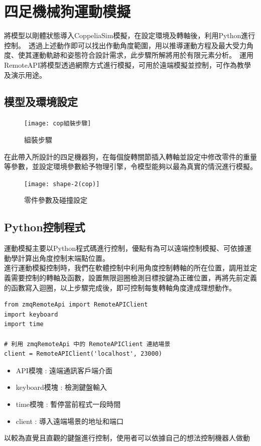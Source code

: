\chapter{四足機械狗運動模擬}
將模型以剛體狀態導入CoppeliaSim模擬，在設定環境及轉軸後，利用Python進行控制。\
透過上述動作即可以找出作動角度範圍，用以推導運動方程及最大受力角度、使其運動軌跡和姿態符合設計需求，此步驟所解將用於有限元素分析。\
運用RemoteAPI將模型透過網際方式進行模擬，可用於遠端模擬並控制，可作為教學及演示用途。\\

\section{模型及環境設定}
\begin{figure}[hbt!]
\center
\texttt{[image: cop組裝步驟]}
\caption{\Large 組裝步驟}\label{cop組裝步驟}
\end{figure}
在此帶入所設計的四足機器狗，在每個旋轉關節插入轉軸並設定中修改零件的重量等參數，並設定環境參數給予物理引擎，令模型能夠以最為真實的情況進行模擬。\\

\begin{figure}[hbt!]
\center
\texttt{[image: shape-2(cop)]}
\caption{\Large 零件參數及碰撞設定}\label{shape-2(cop)}
\end{figure}
\newpage

\section{Python控制程式}
運動模擬主要以Python程式碼進行控制，優點有為可以遠端控制模擬、可依據運動學計算出角度控制末端點位置。\\
進行運動模擬控制時，我們在軟體控制中利用角度控制轉軸的所在位置，調用並定義需要控制的轉軸及函數，設置無限迴圈檢測目標按鍵為正確位置，再將先前定義的函數寫入迴圈，以上步驟完成後，即可控制每隻轉軸角度達成理想動作。\\


\label{模塊導入}
\begin{lstlisting}[caption=\Large 模塊導入]
from zmqRemoteApi import RemoteAPIClient 
import keyboard
import time

# 利用 zmqRemoteApi 中的 RemoteAPIClient 連結場景
client = RemoteAPIClient('localhost', 23000)
\end{lstlisting}

\begin{itemize}
\item API模塊 : 遠端通訊客戶端介面
\item keyboard模塊 : 檢測鍵盤輸入
\item time模塊 : 暫停當前程式一段時間
\item client : 導入遠端場景的地址和端口
\end{itemize}
以較為直覺且直觀的鍵盤進行控制，使用者可以依據自己的想法控制機器人做動\\

